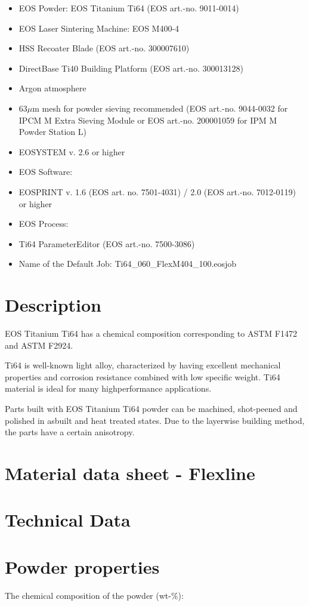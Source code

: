 \documentclass[10pt]{article}
\begin{document}
\begin{itemize}
  \item EOS Powder: EOS Titanium Ti64 (EOS art.-no. 9011-0014)
  \item EOS Laser Sintering Machine: EOS M400-4
  \item HSS Recoater Blade (EOS art.-no. 300007610)
  \item DirectBase Ti40 Building Platform (EOS art.-no. 300013128)
  \item Argon atmosphere
  \item $63 \mu \mathrm{m}$ mesh for powder sieving recommended (EOS art.-no. 9044-0032 for IPCM M Extra Sieving Module or EOS art.-no. 200001059 for IPM M Powder Station L)
  \item EOSYSTEM v. 2.6 or higher
  \item EOS Software:
  \item EOSPRINT v. 1.6 (EOS art. no. 7501-4031) / 2.0 (EOS art.-no. 7012-0119) or higher
  \item EOS Process:
  \item Ti64 ParameterEditor (EOS art.-no. 7500-3086)
  \item Name of the Default Job: Ti64\_060\_FlexM404\_100.eosjob
\end{itemize}

\section*{Description}
EOS Titanium Ti64 has a chemical composition corresponding to ASTM F1472 and ASTM F2924.

Ti64 is well-known light alloy, characterized by having excellent mechanical properties and corrosion resistance combined with low specific weight. Ti64 material is ideal for many highperformance applications.

Parts built with EOS Titanium Ti64 powder can be machined, shot-peened and polished in asbuilt and heat treated states. Due to the layerwise building method, the parts have a certain anisotropy.

\section*{Material data sheet - Flexline}
\section*{Technical Data}
\section*{Powder properties}
The chemical composition of the powder (wt-\%):
\end{document}
